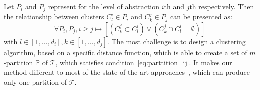 Let $P_i$ and $P_j$ represent for the level of abstraction $i$th and $j$th respectively. Then the relationship between clusters $C_{l}^{i} \in P_i$ and $C_{k}^{j} \in P_j$ can be presented as: 
\begin{equation}
\label{eq:parttition_ij}
	\forall  P_i, P_j, i \geq j \mapsto [(C_{k}^{j} \subset C_{l}^{i}) \vee (C_{k}^{j} \cap  C_{l}^{i} = \emptyset)]    
\end{equation}
with $l \in [1, \ldots, d_i],k \in [1, \ldots, d_j]$. The most challenge is to design a clustering algorithm, based on a specific distance function, which is able to create a set of $m$-partition $\mathbb{P}$ of $\mathcal{T}$, which satisfies condition~\ref{eq:parttition_ij}. 
It makes our method different to most of the state-of-the-art approaches~\cite{wakana2007reproducibility,odonnell2007automatic}, which can produce only one partition of $\mathcal{T}$.

